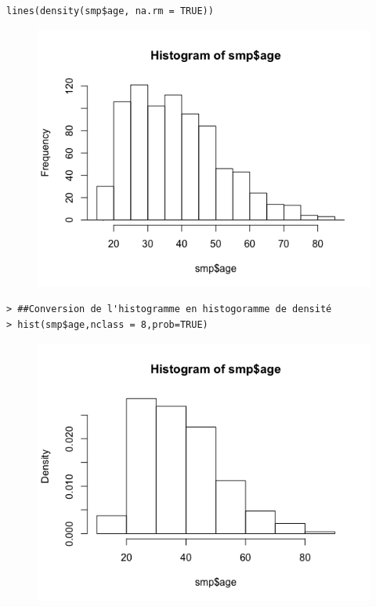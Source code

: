 \begin{lstlisting}[language=html]
lines(density(smp$age, na.rm = TRUE))
\end{lstlisting}

\begin{figure}[H]\begin{center}\includegraphics[scale=0.45]{ilu/lab2-5.png}\end{center}\end{figure}

\begin{lstlisting}[language=html]
> ##Conversion de l'histogramme en histogoramme de densité
> hist(smp$age,nclass = 8,prob=TRUE)
\end{lstlisting}

\begin{figure}[H]\begin{center}\includegraphics[scale=0.45]{ilu/lab2-6.png}\end{center}\end{figure}


